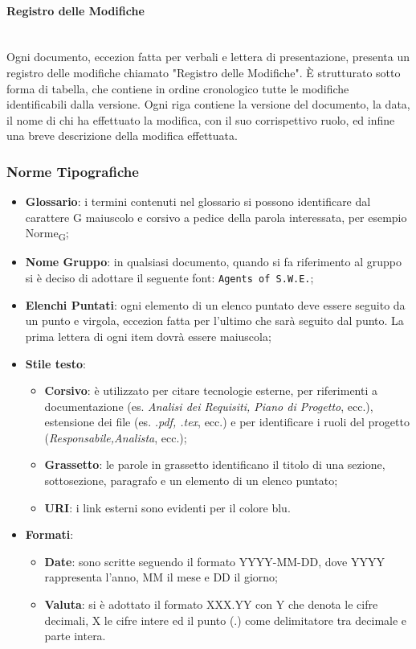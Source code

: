 \paragraph{Registro delle Modifiche} \-\\
Ogni documento, eccezion fatta per verbali e lettera di presentazione, presenta un registro delle modifiche chiamato "Registro delle Modifiche". È strutturato sotto forma di tabella, che contiene in ordine cronologico tutte le modifiche identificabili dalla versione.  Ogni riga contiene la versione del documento, la data, il nome di chi ha effettuato la modifica, con il suo corrispettivo ruolo, ed infine una breve descrizione della modifica effettuata.


\subsubsection{Norme Tipografiche}
\begin{itemize}
	\item \textbf{Glossario}: i termini contenuti nel glossario si possono identificare dal carattere G maiuscolo e corsivo a pedice della parola interessata, per esempio Norme\textsubscript{G};	 		
	\item \textbf{Nome Gruppo}: in qualsiasi documento, quando si fa riferimento al gruppo si è deciso di adottare il seguente font: \texttt{Agents of S.W.E.};
	\item \textbf{Elenchi Puntati}: ogni elemento di un elenco puntato deve essere seguito da un punto e virgola, eccezion fatta per l'ultimo che sarà seguito dal punto. La prima lettera di ogni item dovrà essere maiuscola;
	\item \textbf{Stile testo}:
	\begin{itemize}
		\item \textbf{Corsivo}: è utilizzato per citare tecnologie esterne, per riferimenti a documentazione (es. \textit{Analisi dei Requisiti, Piano di Progetto}, ecc.), estensione dei file (es. \textit{.pdf, .tex}, ecc.) e per identificare i ruoli del progetto (\textit{Responsabile,Analista}, ecc.);	
		\item \textbf{Grassetto}: le parole in grassetto identificano il titolo di una sezione, sottosezione, paragrafo e un elemento di un elenco puntato;
		\item \textbf{URI}:	i link esterni sono evidenti per il colore blu.
	\end{itemize}
	\item \textbf{Formati}:
	\begin{itemize}
		\item \textbf{Date}: sono scritte seguendo il formato YYYY-MM-DD, dove YYYY rappresenta l'anno, MM il mese e DD il giorno;
		\item \textbf{Valuta}: si è adottato il formato XXX.YY con Y che denota le cifre decimali, X le cifre intere ed il punto (.) come delimitatore tra decimale e parte intera.
	\end{itemize}
\end{itemize}


